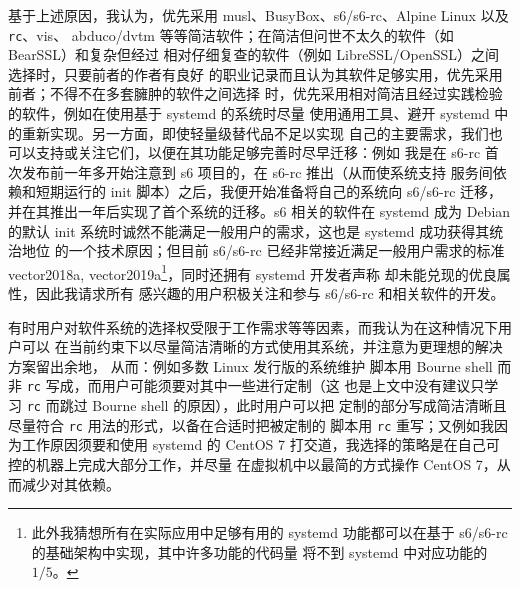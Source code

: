 基于上述原因，我认为，优先采用 musl、BusyBox、s6/s6-rc、Alpine Linux 以及 \verb|rc|、vis、%
abduco/dvtm 等等简洁软件；在简洁但问世不太久的软件（如 BearSSL）和复杂但经过
相对仔细复查的软件（例如 LibreSSL/OpenSSL）之间选择时，只要前者的作者有良好
的职业记录而且认为其软件足够实用，优先采用前者；不得不在多套臃肿的软件之间选择
时，优先采用相对简洁且经过实践检验的软件，例如在使用基于 systemd 的系统时尽量
使用通用工具、避开 systemd 中的重新实现。另一方面，即使轻量级替代品不足以实现
自己的主要需求，我们也可以支持或关注它们，以便在其功能足够完善时尽早迁移：例如
我是在 s6-rc 首次发布前一年多开始注意到 s6 项目的，在 s6-rc 推出（从而使系统支持
服务间依赖和短期运行的 init 脚本）之后，我便开始准备将自己的系统向 s6/s6-rc
迁移，并在其推出一年后实现了首个系统的迁移。s6 相关的软件在 systemd 成为 Debian
的默认 init 系统时诚然不能满足一般用户的需求，这也是 systemd 成功获得其统治地位
的一个技术原因；但目前 s6/s6-rc 已经非常接近满足一般用户需求的标准\cupercite%
{vector2018a, vector2019a}\footnote{此外我猜想所有在实际应用中足够有用的
systemd 功能都可以在基于 s6/s6-rc 的基础架构中实现，其中许多功能的代码量
将不到 systemd 中对应功能的 $1/5$。}，同时还拥有 systemd 开发者声称
却未能兑现的优良属性，因此我请求所有
感兴趣的用户积极关注和参与 s6/s6-rc 和相关软件的开发。

有时用户对软件系统的选择权受限于工作需求等等因素，而我认为在这种情况下用户可以
在当前约束下以尽量简洁清晰的方式使用其系统，并注意为更理想的解决方案留出余地，
从而：例如多数 Linux 发行版的系统维护
脚本用 Bourne shell 而非 \verb|rc| 写成，而用户可能须要对其中一些进行定制（这
也是上文中没有建议只学习 \verb|rc| 而跳过 Bourne shell 的原因），此时用户可以把
定制的部分写成简洁清晰且尽量符合 \verb|rc| 用法的形式，以备在合适时把被定制的
脚本用 \verb|rc| 重写；又例如我因为工作原因须要和使用 systemd 的 CentOS 7
打交道，我选择的策略是在自己可控的机器上完成大部分工作，并尽量
在虚拟机中以最简的方式操作 CentOS 7，从而减少对其依赖。

